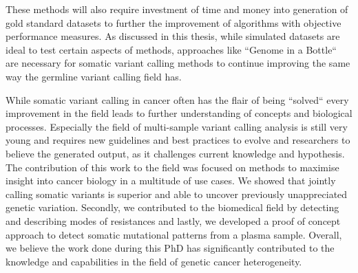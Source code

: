 These methods will also require investment of time and money into generation of gold standard datasets to further the improvement of algorithms with objective performance measures. As discussed in this thesis, while simulated datasets are ideal to test certain aspects of methods, approaches like ``Genome in a Bottle`` are necessary for somatic variant calling methods to continue improving the same way the germline variant calling field has.

While somatic variant calling in cancer often has the flair of being ``solved`` every improvement in the field leads to further understanding of concepts and biological processes. Especially the field of multi-sample variant calling analysis is still very young and requires new guidelines and best practices to evolve and researchers to believe the generated output, as it challenges current knowledge and hypothesis. The contribution of this work to the field was focused on methods to maximise insight into cancer biology in a multitude of use cases. We showed that jointly calling somatic variants is superior and able to uncover previously unappreciated genetic variation. Secondly, we contributed to the biomedical field by detecting and describing modes of resistances and lastly, we developed a proof of concept approach to detect somatic mutational patterns from a plasma sample. Overall, we believe the work done during this PhD has significantly contributed to the knowledge and capabilities in the field of genetic cancer heterogeneity.

